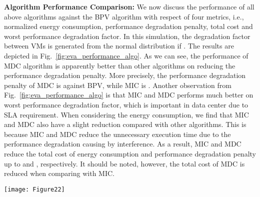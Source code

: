 \documentclass[10pt,journal]{IEEEtran}
\begin{document}
\textbf{Algorithm Performance Comparison:} We now discuss the performance of all above algorithms against the BPV algorithm with respect of four metrics, i.e., normalized energy consumption, performance degradation penalty, total cost and worst performance degradation factor. In this simulation, the degradation factor between VMs is generated from the normal distribution   if . The results are depicted in Fig.~\ref{fig:eva_performance_algo}. As we can see, the performance of MDC algorithm is apparently better than other algorithms on reducing the performance degradation penalty. More precisely, the performance degradation penalty of MDC is  against BPV, while MIC is . Another observation from Fig.~\ref{fig:eva_performance_algo} is that MIC and MDC performs much better on worst performance degradation factor, which is important in data center due to SLA requirement. When considering the energy consumption, we find that MIC and MDC also have a slight reduction compared with other algorithms. This is because MIC and MDC reduce the unnecessary execution time due to the performance degradation causing by interference. As a result, MIC and MDC reduce the total cost of energy consumption and performance degradation penalty up to  and , respectively. It should be noted, however, the total cost of MDC is reduced  when comparing with MIC.
\begin{figure*}[htbp]
\centering
\texttt{[image: Figure22]}
\centering
\caption{\label{fig:eva_performance_algo}Performance of algorithms. (a) Normalized energy consumption against BPV; (b) Normalized performance degradation penalty against BPV; (c) Normalized total cost against BPV; (d) Normalized worst performance degradation factor against BPV.}
\end{figure*}
\end{document}
